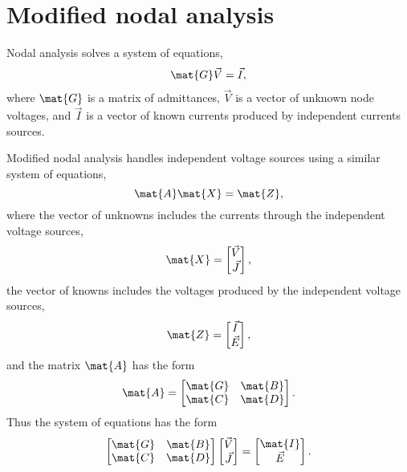 \documentclass[a4paper, 12pt]{article}
\begin{document}
\section{Modified nodal analysis}

Nodal analysis solves a system of equations,
%
\begin{equation}
  \mat{G} \vec{V} = \vec{I},
\end{equation}
%
where $\mat{G}$ is a matrix of admittances, $\vec{V}$ is a vector of
unknown node voltages, and $\vec{I}$ is a vector of known currents
produced by independent currents sources.

Modified nodal analysis handles independent voltage sources using a
similar system of equations,
%
\begin{equation}
  \mat{A} \mat{X} = \mat{Z},
\end{equation}
%
where the vector of unknowns includes the currents through the
independent voltage sources,
%
\begin{equation}
  \mat{X} =   
  \begin{bmatrix}
    \vec{V} \\ \vec{J}
  \end{bmatrix},
\end{equation}
%
the vector of knowns includes the voltages produced by the independent
voltage sources,
%
\begin{equation}
    \mat{Z} =   
  \begin{bmatrix}
    \vec{I} \\ \vec{E}
  \end{bmatrix},
\end{equation}
%
and the matrix $\mat{A}$ has the form
%
\begin{equation}
  \mat{A} =
  \begin{bmatrix}
    \mat{G} & \mat{B} \\
    \mat{C} & \mat{D} \\
  \end{bmatrix}.
\end{equation}
%
Thus the system of equations has the form
%
\begin{equation}
  \begin{bmatrix}
    \mat{G} & \mat{B} \\
    \mat{C} & \mat{D} \\
  \end{bmatrix}
  \begin{bmatrix}
    \vec{V} \\ \vec{J}
  \end{bmatrix}
=
  \begin{bmatrix}
    \mat{I} \\ \vec{E}
  \end{bmatrix}.
\end{equation}
\end{document}
